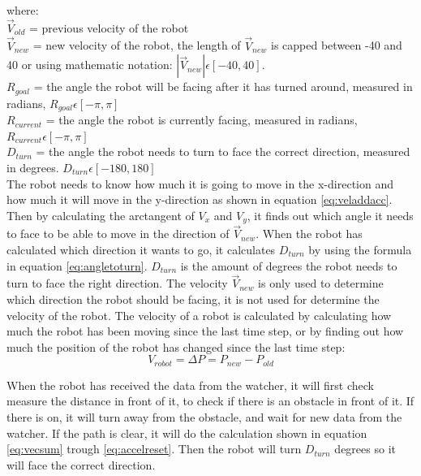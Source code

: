 where:
\\
$\vec{V}_{old}$ = previous velocity of the robot
\\
$\vec{V}_{new}$ = new velocity of the robot, the length of $\vec{V}_{new}$ is capped between -40 and 40 or using mathematic notation: $ |\vec{V}_{new}| \epsilon [-40,40]$.
\\
$R_{goal}$ = the angle the robot will be facing after it has turned around, measured in radians, $R_{goal} \epsilon [-\pi,\pi]$
\\
$R_{current}$ = the angle the robot is currently facing, measured in radians,
$R_{current} \epsilon [-\pi,\pi]$
\\
$D_{turn}$ = the angle the robot needs to turn to face the correct direction, measured in degrees. $D_{turn} \epsilon [-180,180]$
\\


The robot needs to know how much it is going to move in the x-direction and how much it will move in the y-direction as shown in equation \ref{eq:veladdacc}.
Then by calculating the arctangent of $V_x$ and $V_y$, it finds out which angle it needs to face to be able to move in the direction of $\vec{V}_{new}$. When the robot has calculated which direction it wants to go, it calculates $D_{turn}$ by using the formula in equation \ref{eq:angletoturn}. $D_{turn}$ is the amount of degrees the robot needs to turn to face the right direction. The velocity $\vec{V}_{new}$ is only used to determine which direction the robot should be facing, it is not used for determine the velocity of the robot. The velocity of a robot is calculated by calculating how much the robot has been moving since the last time step, or by finding out how much the position of the robot has changed since the last time step: 
\begin{equation}
\label{eq:calcrobvel}
V_{robot} = \Delta P = P_{new} - P_{old}
\end{equation}

When the robot has received the data from the watcher, it will first check measure the distance in front of it, to check if there is an obstacle in front of it. If there is on, it will turn away from the obstacle, and wait for new data from the watcher. If the path is clear, it will do the calculation shown in equation \ref{eq:vecsum} trough \ref{eq:accelreset}. Then the robot will turn $D_{turn}$ degrees so it will face the correct direction.

